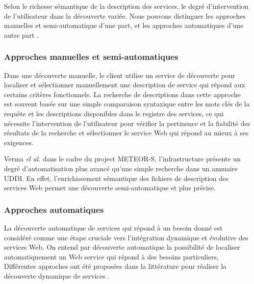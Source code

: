   Selon le richesse sémantique de la description des services, le
  degré d'intervention de l'utilisateur dans la découverte
  variée. Nous pouvons distinguer les approches manuelles et
  semi-automatique d'une part, et les approches automatiques d'une
  autre part \cite{elie2010,garofalakis2004web}.

    \subsubsection{Approches manuelles et semi-automatiques}
    \label{ws-desc:manual}

    Dans une découverte manuelle, le client utilise un service de
    découverte pour localiser et sélectionner manuellement une
    description de service qui répond aux certains critères
    fonctionnels. La recherche de descriptions dans cette approche est
    souvent basée sur une simple comparaison syntaxique entre les mots
    clés de la requête et les descriptions disponibles dans le
    registre des services, ce qui nécessite l'intervention de
    l'utilisateur pour vérifier la pertinence et la fiabilité des
    résultats de la recherche et sélectionner le service Web qui
    répond au mieux à ses exigences.

    Verma \textit{el al.} \cite{verma2005meteor} dans le cadre du
    project \textsc{METEOR-S}, l'infrastructure présente un degré
    d'automatisation plus avancé qu'une simple recherche dans un
    annuaire \textsc{UDDI}. En effet, l'enrichissement sémantique des
    fichiers de description des services Web permet une découverte
    semi-automatique et plus précise.

    \subsubsection{Approches automatiques}
    \label{ws-desc:auto}

    La découverte automatique de services qui répond à un besoin donné
    est considéré comme une étape cruciale vers l'intégration
    dynamique et évolutive des services Web. On entend par découverte
    automatique la possibilité de localiser automatiquement un Web
    service qui répond à des besoins particuliers, Différentes
    approches ont été proposées dans la littérature pour réaliser la
    découverte dynamique de services \cite{paolucci2002semantic,
      bernstein2002discovering, mandell2003bottom,
      benatallah2005automating,keller2005automatic}.

